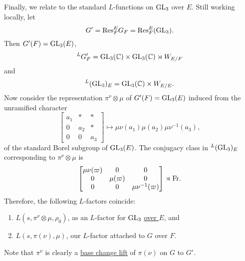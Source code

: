\subsection{}
\label{sec:4.9}


Finally, we relate to the standard $L$-functions on $\mathrm{GL}_3$ over $E$.
Still working locally, let
\[
    G' = \mathrm{Res}_{F}^{E} G_F = \mathrm{Res}_{F}^{E} (\mathrm{GL}_3).
\]
Then $G'(F) = \mathrm{GL}_3(E)$,
\[
    {}^L G'_F = \mathrm{GL}_3(\mathbb{C}) \times \mathrm{GL}_3(\mathbb{C}) \rtimes W_{E/F}
\]
and
\[
    {}^L (\mathrm{GL}_3)_E = \mathrm{GL}_3(\mathbb{C}) \times W_{E/E}.
\]
Now consider the representation $\pi^\nu \otimes \mu$ of $G'(F) = \mathrm{GL}_3(E)$ induced from the unramified character
\[
    \begin{bmatrix}
        a_1 & * & * \\ 0 & a_2 & * \\ 0 & 0 & a_3        
    \end{bmatrix} \mapsto \mu\nu(a_1)\mu(a_2)\mu\nu^{-1}(a_3),
\]
of the standard Borel subgroup of $\mathrm{GL}_3(E)$.
The conjugacy class in ${}^L (\mathrm{GL}_3)_E$ corresponding to $\pi^\nu \otimes \mu$ is
\[
    \begin{bmatrix}
        \mu\nu(\varpi) & 0 & 0 \\ 0 & \mu(\varpi) & 0 \\ 0 & 0 & \mu\nu^{-1}(\varpi)
    \end{bmatrix} \rtimes \mathrm{Fr}.
\]
Therefore, the following $L$-factors coincide:
\begin{enumerate}[label=(\roman*)]
    \item $L(s, \pi^\nu \otimes \mu, \rho_0)$, as an $L$-factor for $\mathrm{GL}_3$ \underline{over $E$}, and
    \item $L(s, \pi(\nu), \mu)$, our $L$-factor attached to $G$ over $F$.
\end{enumerate}
Note that $\pi^\nu$ is clearly a \underline{base change lift} of $\pi(\nu)$ on $G$ to $G'$.

